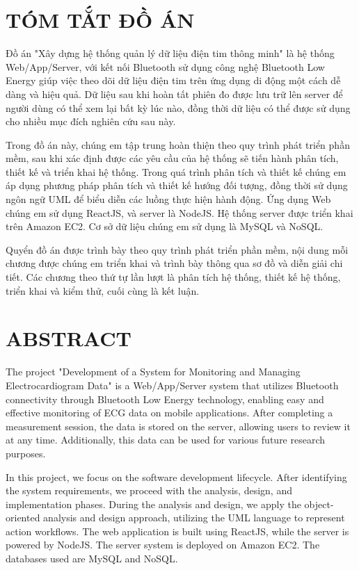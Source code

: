 \section*{TÓM TẮT ĐỒ ÁN}

Đồ án "Xây dựng hệ thống quản lý dữ liệu điện tim thông minh" là hệ thống Web/App/Server, với kết nối Bluetooth
sử dụng công nghệ Bluetooth Low Energy giúp việc theo dõi dữ liệu điện tim trên ứng dụng di động một cách dễ dàng và
hiệu quả. Dữ liệu sau khi hoàn tất phiên đo được lưu trữ lên server để người dùng có thể xem lại bất kỳ lúc nào, đồng thời
dữ liệu có thể được sử dụng cho nhiều mục đích nghiên cứu sau này.

Trong đồ án này, chúng em tập trung hoàn thiện theo quy trình phát triển phần mềm, sau khi xác định được các yêu cầu của hệ thống
sẽ tiến hành phân tích, thiết kế và triển khai hệ thống. Trong quá trình phân tích và thiết kế chúng em áp dụng phương pháp
phân tích và thiết kế hướng đối tượng, đồng thời sử dụng ngôn ngữ UML để biểu diễn các luồng thực hiện hành động. Ứng dụng Web chúng em sử dụng ReactJS, và server
là NodeJS. Hệ thống server được triển khai trên Amazon EC2. Cơ sở dữ liệu chúng em sử dụng là MySQL và NoSQL.

Quyển đồ án được trình bày theo quy trình phát triển phần mềm, nội dung mỗi chương được chúng em triển khai và trình bày thông qua sơ đồ và diễn giải chi tiết. 
Các chương theo thứ tự lần lượt là phân tích hệ thống, thiết kế hệ thống, triển khai và kiểm thử, cuối cùng là kết luận.


\newpage
\section*{ABSTRACT}
The project "Development of a System for Monitoring and Managing Electrocardiogram Data" is a Web/App/Server system that utilizes Bluetooth connectivity through Bluetooth Low Energy technology, enabling easy and effective monitoring of ECG data on mobile applications. After completing a measurement session, the data is stored on the server, allowing users to review it at any time. Additionally, this data can be used for various future research purposes.

In this project, we focus on the software development lifecycle. After identifying the system requirements, 
we proceed with the analysis, design, and implementation phases. During the analysis and design, 
we apply the object-oriented analysis and design approach, utilizing the UML language to represent action workflows. 
The web application is built using ReactJS, while the server is powered by NodeJS. 
The server system is deployed on Amazon EC2. The databases used are MySQL and NoSQL.

